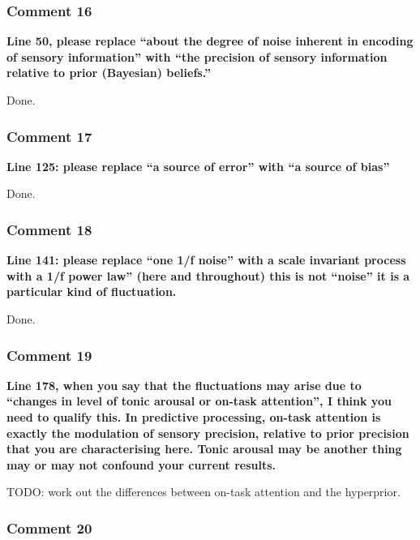 \documentclass[
]{article}
\begin{document}
\hypertarget{comment-16}{%
\subsubsection{Comment 16}\label{comment-16}}

\textbf{Line 50, please replace ``about the degree of noise inherent in
encoding of sensory information'' with ``the precision of sensory
information relative to prior (Bayesian) beliefs.''}

Done.

\hypertarget{comment-17}{%
\subsubsection{Comment 17}\label{comment-17}}

\textbf{Line 125: please replace ``a source of error'' with ``a source
of bias''}

Done.

\hypertarget{comment-18}{%
\subsubsection{Comment 18}\label{comment-18}}

\textbf{Line 141: please replace ``one 1/f noise'' with a scale
invariant process with a 1/f power law'' (here and throughout) this is
not ``noise'' it is a particular kind of fluctuation.}

Done.

\hypertarget{comment-19}{%
\subsubsection{Comment 19}\label{comment-19}}

\textbf{Line 178, when you say that the fluctuations may arise due to
``changes in level of tonic arousal or on-task attention'', I think you
need to qualify this. In predictive processing, on-task attention is
exactly the modulation of sensory precision, relative to prior precision
that you are characterising here. Tonic arousal may be another thing may
or may not confound your current results.}

TODO: work out the differences between on-task attention and the
hyperprior.

\hypertarget{comment-20}{%
\subsubsection{Comment 20}\label{comment-20}}
\end{document}

